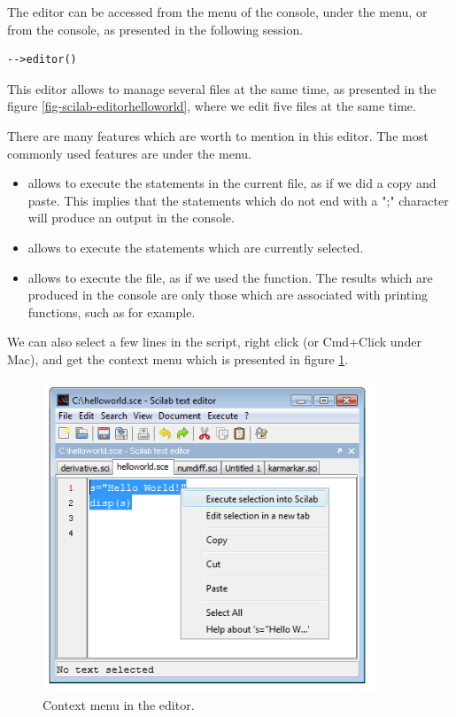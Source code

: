 The editor can be accessed from the menu of the console, under 
the  menu, or from the console, 
as presented in the following session.
\lstset{language=scilabscript}
\begin{lstlisting}
-->editor()
\end{lstlisting}

This editor allows to manage several files at the same time, as 
presented in the figure \ref{fig-scilab-editorhelloworld}, where 
we edit five files at the same time. 

There are many features which are worth to mention in this editor. 
The most commonly used features are under the  menu.
\begin{itemize}
\item {} allows to execute the statements in the 
current file, as if we did a copy and paste. This implies that the 
statements which do not end with a ";" character will produce an output 
in the console.
\item {} allows to execute the statements which 
are currently selected.
\item {} allows to execute the file, as 
if we used the  function. The results which are produced 
in the console are only those which are associated with printing 
functions, such as  for example.
\end{itemize}
We can also select a few lines in the script, right click (or Cmd+Click
under Mac), and get the context menu which is presented in figure \ref{fig-scilab-contextmenu}.

\begin{figure}
\begin{center}
\includegraphics[width=10cm]{introscilab/editor-rightclick.png}
\end{center}
\caption{Context menu in the editor.}
\label{fig-scilab-contextmenu}
\end{figure}

